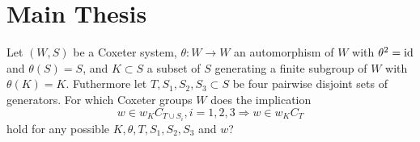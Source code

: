\section{Main Thesis}
\label{sec:main-thesis}

\begin{ques}
	Let $(W,S)$ be a Coxeter system, $\theta : W \to W$ an automorphism of $W$ with $\theta^2 = \operatorname{id}$ and $\theta(S) = S$, and $K \subset S$ a subset of $S$ generating a finite subgroup of $W$ with $\theta(K) = K$. Futhermore let $T,S_1,S_2,S_3 \subset S$ be four pairwise disjoint sets of generators. For which Coxeter groups $W$ does the implication
	\begin{equation}
		\label{eq:main}
		w \in w_K C_{T \cup S_i}, i=1,2,3 \Rightarrow w \in w_K C_T
	\end{equation}
	hold for any possible $K,\theta,T,S_1,S_2,S_3$ and $w$?
\end{ques}

